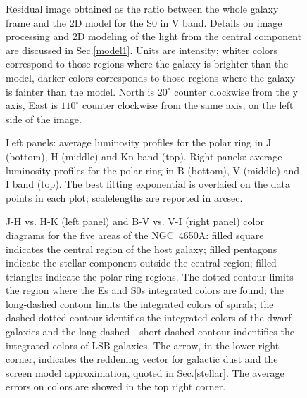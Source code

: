 \documentclass[preprint]{aastex}
\begin{document}
 
\begin{figure}
\caption{\label{fig7}
Residual image obtained as the ratio between the whole galaxy frame and the
2D model for the S0 in V band.
Details on image processing  and 2D modeling of the light from the central
component are discussed in Sec.\ref{model1}.
Units are intensity; whiter colors correspond to those regions where the galaxy
is brighter than the model, darker colors corresponds to those regions where
the galaxy is fainter than the model.
North is $20^\circ$ counter clockwise from the y axis, East
is $110^\circ$ counter clockwise from the same axis,
on the left side of the image.}
\end{figure}
 
 
\begin{figure}
\caption{\label{fig8} Left panels: average luminosity profiles for the
polar ring in J (bottom), H (middle) and Kn band (top).
Right panels: average luminosity profiles for the polar
ring in B (bottom), V (middle) and I band (top).
The best fitting exponential is overlaied on the data points in each plot;
scalelengths are reported in arcsec. }
\end{figure}  
                                                                  
\begin{figure}
\caption{\label{fig9}
J-H vs. H-K (left panel) and B-V vs. V-I (right panel) color diagrams for the
five areas of the NGC~4650A: filled square indicates
the central region of the host galaxy; filled pentagons indicate the
stellar component outside the central region; filled triangles indicate the polar
ring regions.
The dotted contour limits the region where the Es and S0s integrated colors are
found; the long-dashed contour limits the integrated colors of spirals; the
dashed-dotted contour identifies the integrated colors of the dwarf galaxies
and the long dashed - short dashed
contour indentifies the integrated colors of LSB galaxies.
The arrow, in the lower right corner, indicates the reddening vector 
for galactic
dust and the screen model approximation, quoted in Sec.\ref{stellar}. 
The average errors on colors are showed in the top right corner.}
\end{figure}
                                                                    
\end{document}
